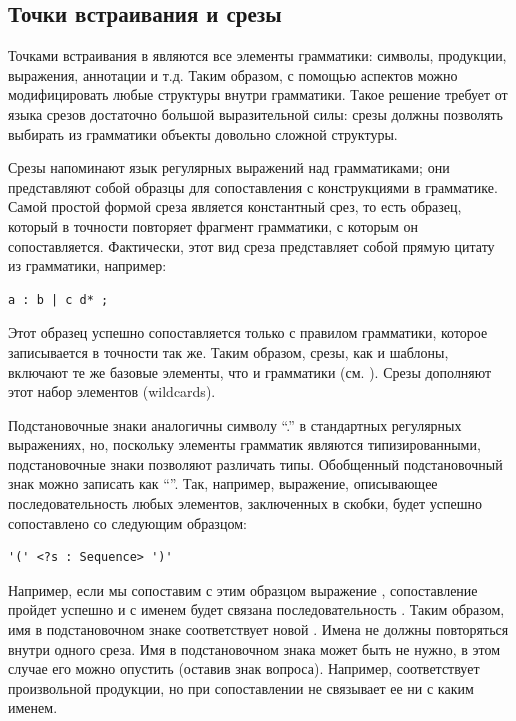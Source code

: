 \subsection{Точки встраивания и срезы}

Точками встраивания в  являются все элементы грамматики: символы, продукции, выражения, аннотации и т.д. Таким образом, с помощью аспектов можно модифицировать любые структуры внутри грамматики. Такое решение требует от языка срезов достаточно большой выразительной силы: срезы должны позволять выбирать из грамматики объекты довольно сложной структуры.

Срезы напоминают язык регулярных выражений над грамматиками; они представляют собой образцы для сопоставления с конструкциями в грамматике. Самой простой формой среза является константный срез, то есть образец, который в точности повторяет фрагмент грамматики, с которым он сопоставляется. Фактически, этот вид среза представляет собой прямую цитату из грамматики, например:
\begin{lstlisting}
a : b | c d* ;
\end{lstlisting}
Этот образец успешно сопоставляется только с правилом грамматики, которое записывается в точности так же. Таким образом, срезы, как и шаблоны, включают те же базовые элементы, что и грамматики (см. ). Срезы дополняют этот набор элементов  (wildcards).

Подстановочные знаки аналогичны символу ``.'' в стандартных регулярных выражениях, но, поскольку элементы грамматик являются типизированными, подстановочные знаки позволяют различать типы. Обобщенный подстановочный знак можно записать как ``''. Так, например, выражение, описывающее последовательность любых элементов, заключенных в скобки, будет успешно сопоставлено со следующим образцом:
\begin{lstlisting}
'(' <?s : Sequence> ')'
\end{lstlisting}
Например, если мы сопоставим с этим образцом выражение , сопоставление пройдет успешно и с именем  будет связана последовательность . Таким образом, имя в подстановочном знаке соответствует новой . Имена не должны повторяться внутри одного среза. Имя в подстановочном знака может быть не нужно, в этом случае его можно опустить (оставив знак вопроса). Например,  соответствует произвольной продукции, но при сопоставлении не связывает ее ни с каким именем.

